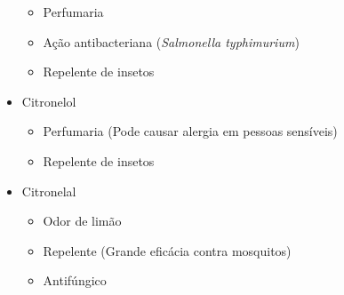 \documentclass[aspectratio=169]{beamer}
\begin{document}
\begin{frame}
\begin{minipage}{0.49\textwidth}
\begin{itemize}
				\begin{itemize}
					\item Perfumaria \pause
					\item Ação antibacteriana (\emph{Salmonella typhimurium}) \cite{kim1995} \pause
					\item Repelente de insetos \cite{barnard2004} \pause
				\end{itemize}
			\item Citronelol \pause
				\begin{itemize}
					\item Perfumaria (Pode causar alergia em pessoas sensíveis) \pause
					\item Repelente de insetos \pause
				\end{itemize}
			\item Citronelal \pause
				\begin{itemize}
					\item Odor de limão \pause
					\item Repelente (Grande eficácia contra mosquitos) \cite{kim2005} \pause
					\item Antifúngico \cite{nakahara2003}
				\end{itemize}
		\end{itemize}
		
	\end{minipage}
\end{frame}

\end{document}
